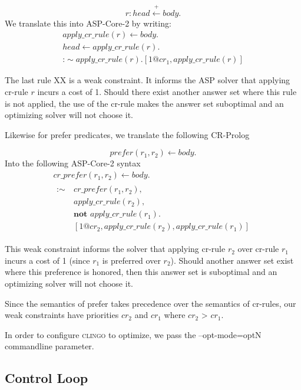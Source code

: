 \begin{equation}
    r: head \stackrel{+}\leftarrow body.
\end{equation}
We translate this into ASP-Core-2 by writing:
\begin{gather}
    apply\_cr\_rule(r) \leftarrow body. \\
    head \leftarrow apply\_cr\_rule(r). \\
    \text{:}\sim apply\_cr\_rule(r). [1@cr_1, apply\_cr\_rule(r)]
\end{gather}

The last rule XX is a weak constraint.
It informs the ASP solver that applying cr-rule $r$ incurs a cost of 1.
Should there exist another answer set where this rule is not applied, the use of the cr-rule makes the answer set suboptimal and an optimizing solver will not choose it.

Likewise for prefer predicates, we translate the following CR-Prolog

\begin{equation}
    prefer(r_1, r_2) \leftarrow body.
\end{equation}
Into the following ASP-Core-2 syntax
\begin{gather}
    cr\_prefer(r_1, r_2) \leftarrow body. \\
    \begin{split}
        \text{:}\sim \
            & cr\_prefer(r_1, r_2), \\
            & apply\_cr\_rule(r_2), \\
            & \textbf{not } apply\_cr\_rule(r_1). \\
            & [1@cr_2, apply\_cr\_rule(r_2), apply\_cr\_rule(r_1)]
    \end{split}
\end{gather}

This weak constraint informs the solver that applying cr-rule $r_2$ over cr-rule $r_1$ incurs a cost of 1 (since $r_1$ is preferred over $r_2$).
Should another answer set exist where this preference is honored, then this answer set is suboptimal and an optimizing solver will not choose it.

Since the semantics of prefer takes precedence over the semantics of cr-rules, our weak constraints have priorities $cr_2$ and $cr_1$ where $cr_2$ > $cr_1$.

In order to configure \textsc{clingo} to optimize, we pass the --opt-mode=optN commandline parameter.

\subsection{Control Loop}

